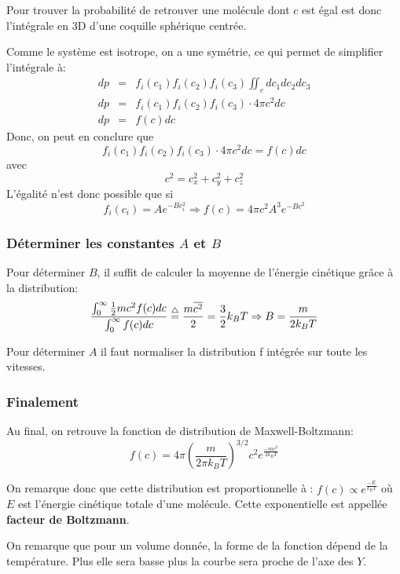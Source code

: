 Pour trouver la probabilité de retrouver une molécule dont $c$ est égal est donc l'intégrale en 3D d'une coquille sphérique centrée.

Comme le système est isotrope, on a une symétrie, ce qui permet de simplifier l'intégrale à:
\begin{eqnarray} 
dp &=& f_i(c_1)f_i(c_2)f_i(c_3) \iint_{c}{dc_1dc_2dc_3} \\
dp &=& f_i(c_1)f_i(c_2)f_i(c_3)\cdot4\pi c^2dc \\
dp &=& f(c)dc
\end{eqnarray}
Donc, on peut en conclure que 
$$ f_i(c_1)f_i(c_2)f_i(c_3)\cdot 4\pi c^2dc = f(c)dc$$
avec
$$ c^2 = c_x^2 + c_y^2 + c_z^2 $$
L'égalité n'est donc possible que si 
$$f_i(c_i) = A e^{-Bc_i^2} \Rightarrow f(c) = 4\pi c^2 A^3 e^{-Bc^2} $$


\subsubsection{Déterminer les constantes $A$ et $B$}
Pour déterminer $B$, il suffit de calculer la moyenne de l'énergie cinétique grâce à la distribution:
$$ \frac{\int_{0}^{\infty}{\frac{1}{2}mc^2f(c)dc}}{\int_{0}^{\infty}{f(c)dc}} \buildrel\triangle\over = \frac{m\overline{c^2}}{2} = \frac{3}{2}k_BT \Rightarrow B = \frac{m}{2k_BT}$$

Pour déterminer $A$ il faut normaliser la distribution f intégrée sur toute les vitesses.

\subsubsection{Finalement}
Au final, on retrouve la fonction de distribution de Maxwell-Boltzmann:
$$ f(c) = 4\pi(\frac{m}{2\pi k_BT})^{3/2}c^2e^{\frac{-mc^2}{2k_BT}}$$

On remarque donc que cette distribution est proportionnelle à : $ f(c) \propto e^{\frac{-E}{k_BT}} $ où $E$ est l'énergie cinétique totale d'une molécule. Cette exponentielle est appellée {\bf facteur de Boltzmann}.

On remarque que pour un volume donnée, la forme de la fonction dépend de la température. Plus elle sera basse plus la courbe sera proche de l'axe des $Y$.


